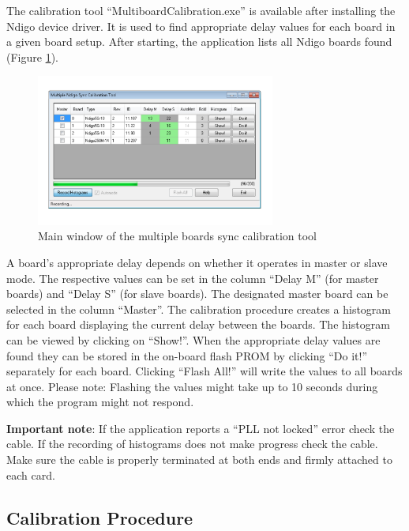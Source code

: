     The calibration tool ``MultiboardCalibration.exe'' is available after installing the Ndigo device driver. It is used to find appropriate delay values for each board in a given board setup. After starting, the application lists all Ndigo boards found (Figure \ref{fig:SyncCalibTool}).\par

    \begin{figure}[ht]
        \begin{center}
            \includegraphics[width=0.7\textwidth]{figures/SyncCalibTool.pdf}
            \caption{Main window of the multiple boards sync calibration tool\label{fig:SyncCalibTool}}
        \end{center}
    \end{figure}

    A board's appropriate delay depends on whether it operates in master or slave mode. The respective values can be set in the column ``Delay M'' (for master boards) and ``Delay S'' (for slave boards). The designated master board can be selected in the column ``Master''. The calibration procedure creates a histogram for each board displaying the current delay between the boards. The histogram can be viewed by clicking on ``Show!''. When the appropriate delay values are found they can be stored in the on-board flash PROM by clicking ``Do it!'' separately for each board. Clicking ``Flash All!'' will write the values to all boards at once. Please note: Flashing the values might take up to 10 seconds during which the program might not respond.\par

\textbf{Important note}: If the application reports a ``PLL not locked'' error check the cable. If the recording of histograms does not make progress check the cable. Make sure the cable is properly terminated at both ends and firmly attached to each card.

    \subsection{Calibration Procedure}

